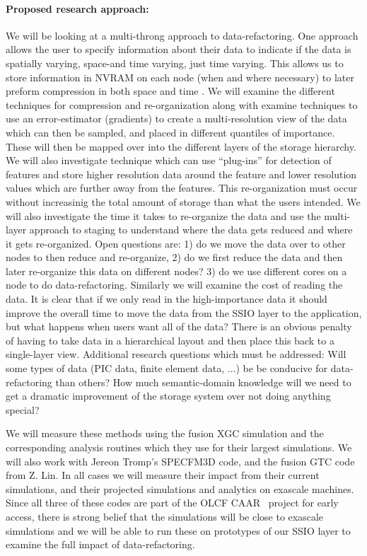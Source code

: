 \paragraph{Proposed research approach:} 
We will be looking at a multi-throng approach to data-refactoring. One approach allows the user to specify information about their data
to indicate if the data is spatially varying, space-and time varying, just time varying. This allows us to store information in NVRAM on each
node (when and where necessary) to later preform compression in both space and time . We will examine the different techniques for
compression and re-organization along with examine techniques to use an error-estimator (gradients) to create a multi-resolution view of the
data which can then be sampled, and placed in different quantiles of importance. These will then be mapped over into the different layers of 
the storage hierarchy.  We will also investigate technique which can use ``plug-ins'' for detection of features and store higher resolution data
around the feature and lower resolution values which are further away from the features. This re-organization must occur without increasinig the
total amount of storage than what the users intended. We will also investigate the time it takes to re-organize the data and use the multi-layer
approach to staging to understand where the data gets reduced and where it gets re-organized. Open questions are: 1) do we move the
data over to other nodes to then reduce and re-organize, 2) do we first reduce the data and then later re-organize this data on different nodes?
3) do we use different cores on a node to do data-refactoring. Similarly we will examine the cost of reading the data. It is clear that if we only
read in the high-importance data it should improve the overall time to move the data from the SSIO layer to the application, but what happens
when users want all of the data? There is an obvious penalty of having to take data in a hierarchical layout and then place this back to
a single-layer view.  Additional research questions which must be addressed: Will some types of data (PIC data, finite element data, ...) be
be conducive  for data-refactoring than others? How much semantic-domain knowledge will we need to get a dramatic improvement of the storage
system over not doing anything special? 

We will measure these methods using the fusion XGC simulation and the corresponding analysis routines which they use for their largest
simulations. We will also work with Jereon Tromp's SPECFM3D code, and the fusion GTC code from Z. Lin. In all cases
we will measure their impact from their current simulations, and their projected simulations and analytics on exascale machines. Since 
all three of these codes are part of the OLCF CAAR~\cite{CAAR} project for early access, there is strong belief that the simulations will
be close to exascale simulations and we will be able to run these on prototypes of our SSIO layer to examine the full impact of data-refactoring.

